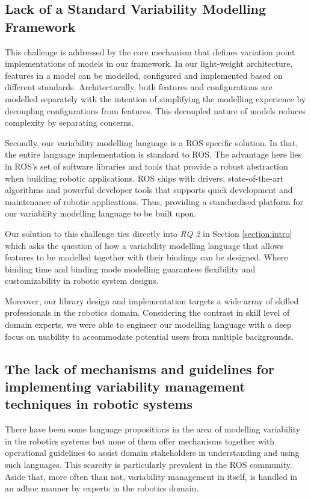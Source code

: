 \documentclass[conference]{IEEEtran}
\begin{document}
\subsection{Lack of a Standard Variability Modelling Framework}
This challenge is addressed by the core mechanism that defines variation point implementations of models in our framework. In our light-weight architecture, features in a model can be modelled, configured and implemented based on different standards. Architecturally, both features and configurations are modelled separately with the intention of simplifying the modelling experience by decoupling configurations from features. This decoupled nature of models reduces complexity by separating concerns.

Secondly, our variability modelling language is a ROS specific solution. In that, the entire language implementation is standard to ROS. The advantage here lies in ROS's set of software libraries and tools that provide a robust abstraction when building robotic applications. ROS ships with drivers, state-of-the-art algorithms and powerful developer tools that supports quick development and maintenance of robotic applications. Thus, providing a standardised platform for our variability modelling language to be built upon.

Our solution to this challenge ties directly into \textit{RQ 2} in Section \ref{section:intro} which asks the question of how a variability modelling language that allows features to be modelled together with their bindings can be designed. Where binding time and binding mode modelling guarantees flexibility and customizability in robotic system designs.

Moreover, our library design and implementation targets a wide array of skilled professionals in the robotics domain. Considering the contrast in skill level of domain experts, we were able to engineer our modelling language with a deep focus on usability to accommodate potential users from multiple backgrounds.

\subsection{The lack of mechanisms and guidelines for implementing variability management techniques in robotic systems}
There have been some language propositions in the area of modelling variability in the robotics systems but none of them offer mechanisms together with operational guidelines to assist domain stakeholders in understanding and using such languages. This scarcity is particularly prevalent in the ROS community. Aside that, more often than not, variability management in itself, is handled in an adhoc manner by experts in the robotics domain.
\end{document}
